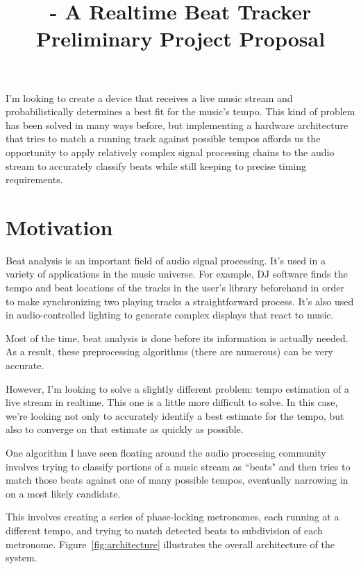 \documentclass[letterpaper]{article}
\title{\projname{} - A Realtime Beat Tracker \\ Preliminary Project Proposal}
\begin{document}
\maketitle

I'm looking to create a device that receives a live music stream and
probabilistically determines a best fit for the music's tempo.  This kind of
problem has been solved in many ways before, but implementing a hardware
architecture that tries to match a running track against possible tempos
affords us the opportunity to apply relatively complex signal processing chains
to the audio stream to accurately classify beats while still keeping to precise
timing requirements.

\section{Motivation}

    Beat analysis is an important field of audio signal processing.  It's used
    in a variety of applications in the music universe.  For example, DJ
    software finds the tempo and beat locations of the tracks in the user's
    library beforehand in order to make synchronizing two playing tracks a
    straightforward process.  It's also used in audio-controlled lighting to
    generate complex displays that react to music.

    Most of the time, beat analysis is done before its information is actually
    needed.  As a result, these preprocessing algorithms (there are numerous)
    can be very accurate.

    However, I'm looking to solve a slightly different problem: tempo
    estimation of a live stream in realtime.  This one is a little more
    difficult to solve.  In this case, we're looking not only to accurately
    identify a best estimate for the tempo, but also to converge on that
    estimate as quickly as possible.

    One algorithm I have seen floating around the audio processing community
    involves trying to classify portions of a music stream as ``beats" and then
    tries to match those beats against one of many possible tempos, eventually
    narrowing in on a most likely candidate.

    This involves creating a series of phase-locking metronomes, each running
    at a different tempo, and trying to match detected beats to subdivision of
    each metronome.  Figure~\ref{fig:architecture} illustrates the overall
    architecture of the system.
\end{document}
